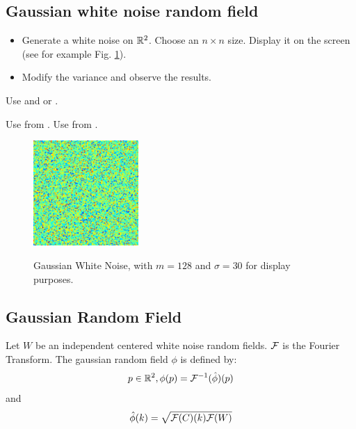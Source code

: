 \subsection{Gaussian white noise random field}

\begin{qbox}
\begin{itemize}
 \item 
Generate a white noise on ${\mathbb{R}}^2$. Choose an $n\times n$ size. Display it on the screen (see for example Fig. \ref{fig:wn}).
\item 
Modify the variance and observe the results.
\end{itemize}
\end{qbox}

\begin{mcomment}
\begin{mremark}
 Use  and  or .
\end{mremark}
\end{mcomment}

\begin{pcomment}
\begin{premark}
 Use  from . Use  from .
\end{premark}
\end{pcomment}


\begin{figure}[H]
\centering\caption{Gaussian White Noise, with $m=128$ and $\sigma=30$ for display purposes.}%
 \includegraphics[width=4cm]{../matlab/wn.png}%
 \label{fig:wn}%
\end{figure}

\subsection{Gaussian Random Field}
Let $W$ be an independent centered white noise random fields. ${\mathcal{F}}$ is the Fourier Transform. The gaussian random field $\phi$ is defined by:
$$p\in{\mathbb{R}}^2, \phi(p) = {\mathcal{F}}^{-1}(\hat{\phi})(p)$$
and 
$$ \hat{\phi}(k) = \sqrt{{\mathcal{F}}(C)(k){\mathcal{F}}(W)}$$


